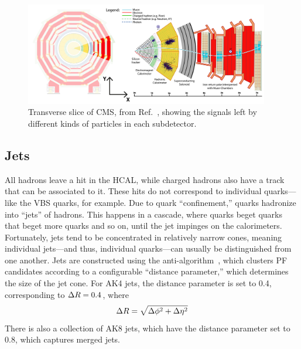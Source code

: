 \begin{figure}[htb]
    \centering
    \includegraphics[width=0.95\textwidth]{fig/cms/particle_id_slice.pdf}
    \caption{
        Transverse slice of CMS, from Ref.~\cite{Davis:2205172}, showing the signals left by different kinds of particles in each subdetector.
    }
    \label{fig:cms_particle_id}
\end{figure}

\subsection{Jets}
All hadrons leave a hit in the HCAL, while charged hadrons also have a track that can be associated to it. 
These hits do not correspond to individual quarks---like the VBS quarks, for example. 
Due to quark ``confinement,'' quarks hadronize into ``jets'' of hadrons. 
This happens in a cascade, where quarks beget quarks that beget more quarks and so on, until the jet impinges on the calorimeters. 
Fortunately, jets tend to be concentrated in relatively narrow cones, meaning individual jets---and thus, individual quarks---can usually be distinguished from one another. 
Jets are constructed using the anti-\kt algorithm~\cite{Cacciari:2008gp, Cacciari:2011ma}, which clusters PF candidates according to a configurable ``distance parameter,'' which determines the size of the jet cone. 
For AK4 jets, the distance parameter is set to 0.4, corresponding to $\Delta R = 0.4$, where
\begin{equation}
    \Delta R = \sqrt{\Delta\phi^2 + \Delta\eta^2}
\end{equation}
There is also a collection of AK8 jets, which have the distance parameter set to 0.8, which captures merged jets.


